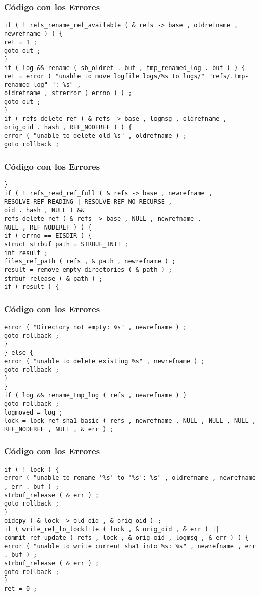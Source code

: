 \documentclass{beamer}
\begin{document}
\begin{frame}[fragile]
\frametitle{C\'odigo con los Errores}
\begin{verbatim}
if ( ! refs_rename_ref_available ( & refs -> base , oldrefname , newrefname ) ) { 
ret = 1 ; 
goto out ; 
} 
if ( log && rename ( sb_oldref . buf , tmp_renamed_log . buf ) ) { 
ret = error ( "unable to move logfile logs/%s to logs/" "refs/.tmp-renamed-log" ": %s" , 
oldrefname , strerror ( errno ) ) ; 
goto out ; 
} 
if ( refs_delete_ref ( & refs -> base , logmsg , oldrefname , 
orig_oid . hash , REF_NODEREF ) ) { 
error ( "unable to delete old %s" , oldrefname ) ; 
goto rollback ; 
\end{verbatim}
\end{frame}
\begin{frame}[fragile]
\frametitle{C\'odigo con los Errores}
\begin{verbatim}
} 
if ( ! refs_read_ref_full ( & refs -> base , newrefname , 
RESOLVE_REF_READING | RESOLVE_REF_NO_RECURSE , 
oid . hash , NULL ) && 
refs_delete_ref ( & refs -> base , NULL , newrefname , 
NULL , REF_NODEREF ) ) { 
if ( errno == EISDIR ) { 
struct strbuf path = STRBUF_INIT ; 
int result ; 
files_ref_path ( refs , & path , newrefname ) ; 
result = remove_empty_directories ( & path ) ; 
strbuf_release ( & path ) ; 
if ( result ) { 
\end{verbatim}
\end{frame}
\begin{frame}[fragile]
\frametitle{C\'odigo con los Errores}
\begin{verbatim}
error ( "Directory not empty: %s" , newrefname ) ; 
goto rollback ; 
} 
} else { 
error ( "unable to delete existing %s" , newrefname ) ; 
goto rollback ; 
} 
} 
if ( log && rename_tmp_log ( refs , newrefname ) ) 
goto rollback ; 
logmoved = log ; 
lock = lock_ref_sha1_basic ( refs , newrefname , NULL , NULL , NULL , 
REF_NODEREF , NULL , & err ) ; 
\end{verbatim}
\end{frame}
\begin{frame}[fragile]
\frametitle{C\'odigo con los Errores}
\begin{verbatim}
if ( ! lock ) { 
error ( "unable to rename '%s' to '%s': %s" , oldrefname , newrefname , err . buf ) ; 
strbuf_release ( & err ) ; 
goto rollback ; 
} 
oidcpy ( & lock -> old_oid , & orig_oid ) ; 
if ( write_ref_to_lockfile ( lock , & orig_oid , & err ) || 
commit_ref_update ( refs , lock , & orig_oid , logmsg , & err ) ) { 
error ( "unable to write current sha1 into %s: %s" , newrefname , err . buf ) ; 
strbuf_release ( & err ) ; 
goto rollback ; 
} 
ret = 0 ; 
\end{verbatim}
\end{frame}
\end{document}
